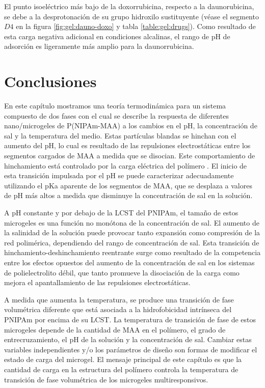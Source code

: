 El punto isoel\'ectrico m\'as bajo de la doxorrubicina, respecto a la daunorubicina, se debe a la desprotonaci\'on de su grupo hidroxilo sustituyente (v\'ease  el segmento $D4$ en la figura \ref{fig:gel:dauno-doxo} y tabla \ref{table:gel:drugs}). Como resultado de esta carga negativa adicional en condiciones alcalinas, el rango de pH de adsorci\'on es ligeramente m\'as amplio para la daunorrubicina.

\section{Conclusiones}

En este cap\'itulo mostramos una teor\'ia termodin\'amica  para un sistema compuesto de dos fases con el cual se describe la respuesta de diferentes nano/microgeles de P(NIPAm-MAA) a los cambios en el pH, la concentraci\'on de sal y la temperatura del medio.
Estas part\'iculas blandas se hinchan con el aumento del pH, lo cual es resultado de las repulsiones electrost\'aticas entre los segmentos cargados de MAA a medida que se disocian.
Este comportamiento de hinchamiento est\'a controlado por la carga el\'ectrica del pol\'imero  \cite{FernandezNieves2000}.
El inicio de esta transici\'on impulsada por el pH se puede caracterizar adecuadamente utilizando el pKa aparente de los segmentos de MAA, que se desplaza a valores de pH m\'as altos a medida que disminuye la concentraci\'on de sal en la soluci\'on.

A pH constante y por debajo de la LCST del PNIPAm, el tama\~no de estos microgeles es una funci\'on no mon\'otona de la concentraci\'on de sal.
El aumento de la salinidad de la soluci\'on puede provocar tanto expansi\'on como compresi\'on de la red polim\'erica, dependiendo del rango de concentraci\'on de sal.
Esta transici\'on de hinchamiento-deshinchamiento reentrante surge como resultado de la competencia entre los efectos opuestos del aumento de la concentraci\'on de sal en los sistemas de polielectrolito d\'ebil, que tanto promueve la disociaci\'on de la carga como mejora el apantallamiento de las repulsiones electrost\'aticas.


A medida que aumenta la temperatura, se produce una transici\'on de fase  volum\'etrica diferente que est\'a asociada a la hidrofobicidad intr\'inseca del PNIPAm por encima de su LCST.
La temperatura de transici\'on de fase de estos microgeles depende de la cantidad de MAA en el pol\'imero, el grado de entrecruzamiento, el pH de la soluci\'on y la concentraci\'on de sal.
Cambiar estas variables independientes y/o los par\'ametros de dise\~no son formas de modificar el estado de carga del microgel.
El mensaje principal de este cap\'itulo es que la cantidad de carga en la estructura del pol\'imero controla la temperatura de transici\'on de fase volum\'etrica de los microgeles multiresponsivos.

